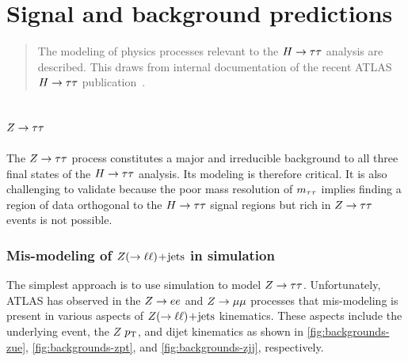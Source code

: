 \chapter[Signal and background predictions][Signal and background predictions]{Signal and background predictions}
\label{chap:backgrounds}

\begin{quote}
  The modeling of physics processes relevant to the $H\rightarrow\tau\tau$ analysis are described. This draws from internal documentation of the recent ATLAS $H\rightarrow\tau\tau$ publication~\cite{ATL-COM-PHYS-2014-170}.
\end{quote}

\section{$Z\rightarrow\tau\tau$}
\label{sec:backgrounds-ztautau}

The $Z\rightarrow\tau\tau$ process constitutes a major and irreducible background to all three final states of the $H\rightarrow\tau\tau$ analysis. Its modeling is therefore critical. It is also challenging to validate because the poor mass resolution of $m_{\tau\tau}$ implies finding a region of data orthogonal to the $H\rightarrow\tau\tau$ signal regions but rich in $Z\rightarrow\tau\tau$ events is not possible.

\subsection{Mis-modeling of $Z (\rightarrow \ell\ell)\!+\!\text{jets}$ in simulation}
\label{sec:backgrounds-zjets}

The simplest approach is to use simulation to model $Z\rightarrow\tau\tau$. Unfortunately, ATLAS has observed in the $Z \rightarrow ee$ and $Z \rightarrow \mu\mu$ processes that mis-modeling is present in various aspects of $Z (\rightarrow \ell\ell)\!+\!\text{jets}$ kinematics. These aspects include the underlying event, the $Z$ $p_{\mathrm{T}}$, and dijet kinematics as shown in \cref{fig:backgrounds-zue}, \cref{fig:backgrounds-zpt}, and \cref{fig:backgrounds-zjj}, respectively.


